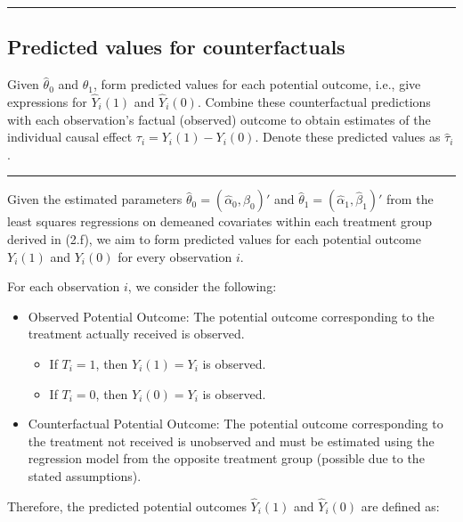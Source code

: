 \documentclass{article}
\newenvironment{colorparagraph}[1]{\par\color{#1}}{\par}
\begin{document}
\newpage
\begin{colorparagraph}{questioncolor}
\rule{\textwidth}{0.5pt}

\label{q2g}\subsection{Predicted values for counterfactuals}
Given \(\hat{\theta}_0\) and \(\hat{\theta}_1\), form predicted values for each potential outcome, i.e., give expressions for \(\hat{Y}_i(1)\) and \(\hat{Y}_i(0)\). Combine these counterfactual predictions with each observation's factual (observed) outcome to obtain estimates of the individual causal effect \(\tau_i = Y_i(1) - Y_i(0)\). Denote these predicted values as \(\hat{\tau}_i\).

\rule{\textwidth}{0.5pt}
\end{colorparagraph}

Given the estimated parameters \(\hat{\theta}_0 = (\hat{\alpha}_0, \hat{\beta}_0)'\) and \(\hat{\theta}_1 = (\hat{\alpha}_1, \hat{\beta}_1)'\) from the least squares regressions on demeaned covariates within each treatment group derived in (2.f), we aim to form predicted values for each potential outcome \(Y_i(1)\) and \(Y_i(0)\) for every observation \(i\).

For each observation \(i\), we consider the following:

\begin{itemize}
  \item Observed Potential Outcome: The potential outcome corresponding to the treatment actually received is observed.
  \begin{itemize}
    \item If \(T_i = 1\), then \(Y_i(1) = Y_i\) is observed.
    \item If \(T_i = 0\), then \(Y_i(0) = Y_i\) is observed.
  \end{itemize}
  \item Counterfactual Potential Outcome: The potential outcome corresponding to the treatment not received is unobserved and must be estimated using the regression model from the opposite treatment group (possible due to the stated assumptions).
\end{itemize}

Therefore, the predicted potential outcomes \(\hat{Y}_i(1)\) and \(\hat{Y}_i(0)\) are defined as:
\end{document}
